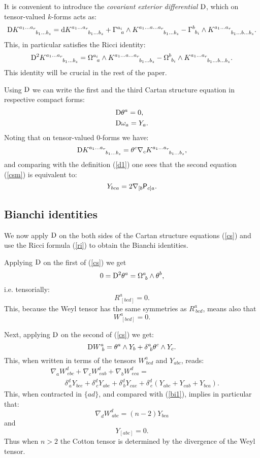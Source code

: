 \documentclass[letterpaper]{amsart}
\theoremstyle{definition}
\theoremstyle{remark}
\newcommand{\be}{\begin{equation}}
\newcommand{\ee}{\end{equation}}
\newcommand{\D}{{\rm D}}
\newcommand{\dz}{\wedge}
\newcommand{\der}{{\rm d}}
\newcommand{\Rho}{{\mbox{\sf P}}}
\begin{document}
It is convenient to introduce the \emph{covariant exterior
  differential} $\D$, which on tensor-valued $k$-forms acts as:
$$\D K^{a_1\dots a_r}_{\quad\quad\,\,\,b_1\dots b_s}=\der K^{a_1\dots a_r}_{\quad\quad\,\,\,b_1\dots
  b_s}+
\Gamma^{a_i}_{\,\,\,\,a}\dz K^{a_1\dots a\dots a_r}_{\quad\quad\quad\,\,\,\, b_1\dots
  b_s}-\Gamma^b_{~b_i}\dz K^{a_1\dots a_r}_{\quad\quad\,\,\,b_1\dots
  b\dots b_s}.$$
This, in particular satisfies the Ricci identity:
\be
\D^2K^{a_1\dots a_r}_{\quad\quad\,\,\,b_1\dots b_s}=\Omega^{a_i}_{\,\,\,\,a}\dz K^{a_1\dots a\dots a_r}_{\quad\quad\quad\,\,\,\, b_1\dots
  b_s}-\Omega^b_{~b_i}\dz K^{a_1\dots a_r}_{\quad\quad\,\,\,b_1\dots
  b\dots b_s}.\label{ri}\ee
This identity will be crucial in the rest of the paper.

Using $\D$ we can write the first and the third Cartan structure
equation in respective compact forms:
\be\begin{aligned}
&\D\theta^a=0,\\
&\D\omega_a=Y_a.
\end{aligned}\label{csm}
\ee
Noting that on tensor-valued 0-forms we have: 
$$\D K^{a_1\dots a_r}_{\quad\quad\,\,\,b_1\dots b_s}=
\theta^c\nabla_cK^{a_1\dots a_r}_{\quad\quad\,\,\,b_1\dots b_s},$$
and comparing with the definition (\ref{d1}) one sees that the second equation
(\ref{csm}) is equivalent to:
\be
Y_{bca}=2\nabla_{[b}\Rho_{c]a}.\label{dd1}\ee
\subsection{Bianchi identities}
We now apply $\D$ on the both sides of the Cartan structure equations
(\ref{cs}) and use the Ricci formula (\ref{ri}) to obtain the Bianchi 
identities.

Applying $\D$ on the first of (\ref{cs}) we get
$$0=\D^2\theta^a=\Omega^a_{~b}\dz\theta^b,$$ i.e. tensorially:
$$R^a_{~[bcd]}=0.$$
This, because the Weyl tensor has the same symmetries as $R^a_{~bcd}$, means also
that
\be
W^a_{~[bcd]}=0.\label{bi1}\ee

Next, applying $\D$ on the second of (\ref{cs}) we get:
$$\D W^a_{~b}=\theta^a\dz Y_b+\delta^a_{~b}\theta^c\dz Y_c.$$
This, when written in terms of the tensors $W^a_{~bcd}$ and $Y_{abc}$,
reads:
\be
\begin{aligned}
&\nabla_a W^d_{~ebc}+\nabla_c W^d_{~eab}+\nabla_b W^d_{~eca}=\\
&\quad\quad\delta^d_{~a}Y_{bce}+\delta^d_{~c}Y_{abe}+\delta^d_{~b}Y_{cae}+
\delta^d_{~e}(Y_{abc}+Y_{cab}+Y_{bca}).
\end{aligned}\label{13}
\ee
This, when contracted in $\{ad\}$, and compared with (\ref{bi1}),
implies in particular that:
\be\nabla_dW^d_{~abc}=(n-2)Y_{bca}\label{bi2}\ee
and
\be
Y_{[abc]}=0.\label{bi3}\ee
Thus when $n>2$ the Cotton tensor is determined by the divergence of
the Weyl tensor. 
\end{document}
